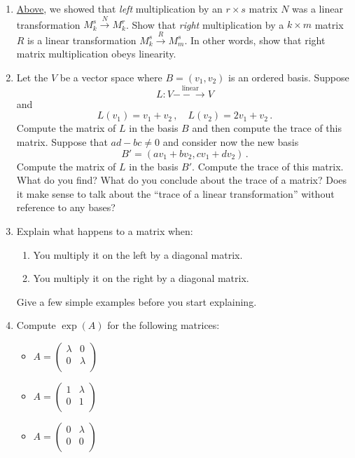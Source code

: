 \begin{enumerate}
\item \label{mat_prob} \hyperlink{leftmult}{Above}, we showed that \emph{left} multiplication by an $r \times s$ matrix $N$  was a linear transformation $M^s_k \stackrel{N}{\longrightarrow} M^r_k$.  Show that \emph{right} multiplication by a $k \times m$ matrix $R$ is a linear transformation $M^s_k \stackrel{R}{\longrightarrow} M^s_m$.  In other words, show that right matrix multiplication obeys linearity.



\item Let the $V$ be a vector space where $B=(v_1,v_2)$ is an ordered basis. Suppose
\[
L:V\stackrel{\textrm{linear}}{-\!\!-\!\!\!\longrightarrow} V
\]
and \[L(v_1)=v_1+v_2 \, ,\quad L(v_2)=2v_1+v_2\, .\] Compute the matrix of $L$ in the basis $B$ and then compute the trace of this matrix.
Suppose that $ad-bc\neq 0$ and consider now the new basis
\[
B'=(av_1+b v_2,cv_1+dv_2)\, .
\]
Compute the matrix of $L$ in the basis $B'$. Compute the trace of this matrix. What do you find? What do you conclude about the trace of a matrix? Does it make sense to talk about the ``trace of a linear transformation'' without reference to any bases? 

\item Explain what happens to a matrix when:
\begin{enumerate}
\item You multiply it on the left by a diagonal matrix.
\item You multiply it on the right by a diagonal matrix.
\end{enumerate}
Give a few simple examples before you start explaining.





\item  \label{expprob}Compute $\exp (A)$ for the following matrices:
\begin{itemize}
\item $A = \begin{pmatrix}
\lambda & 0 \\
0 & \lambda \\
\end{pmatrix}$
\item $A = \begin{pmatrix}
1 & \lambda \\
0 & 1 \\
\end{pmatrix}$
\item $A = \begin{pmatrix}
0 & \lambda \\
0 & 0 \\
\end{pmatrix}$
\end{itemize}


\end{enumerate}
